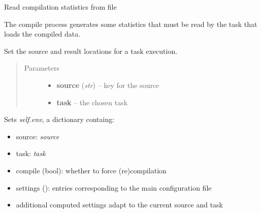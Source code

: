 \documentclass[letterpaper,10pt,english]{sphinxmanual}
\begin{document}
\begin{fulllineitems}
\begin{fulllineitems}
\end{fulllineitems}


\begin{fulllineitems}
\label{graf/graf:graf.Graf.read_stats}
Read compilation statistics from file

The compile process generates some statistics that must be read by the task that loads the compiled data.

\end{fulllineitems}


\begin{fulllineitems}
\label{graf/graf:graf.Graf.set_environment}
Set the source and result locations for a task execution.
\begin{quote}\begin{description}
\item[{Parameters}] \leavevmode\begin{itemize}
\item {} 
\textbf{source} (\emph{str}) --
key for the source

\item {} 
\textbf{task} --
the chosen task

\end{itemize}

\end{description}\end{quote}

Sets \emph{self.env}, a dictionary containg:
\begin{itemize}
\item {} 
source: \emph{source}

\item {} 
task: \emph{task}

\item {} 
compile (bool): whether to force (re)compilation

\item {} 
settings (\href{http://docs.python.org/library/configparser.html\#ConfigParser.ConfigParser}{}): entries corresponding to the main configuration file

\item {} 
additional computed settings adapt to the current source and task


\end{itemize}
\end{fulllineitems}
\end{fulllineitems}
\end{document}
